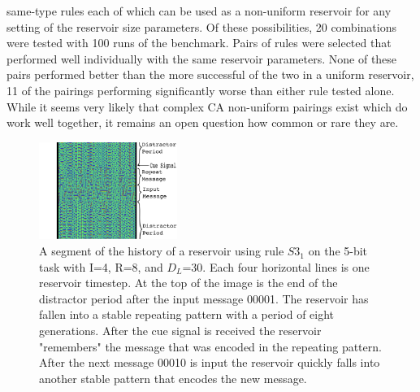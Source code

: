 \documentclass{elsarticle}
\begin{document}
\begin{multicols}{2}
            same-type rules each of which can be used as a non-uniform 
            reservoir for  any setting of the reservoir size parameters. Of 
            these possibilities, 20 combinations were tested with 100 runs of 
            the benchmark. Pairs of rules were selected that performed well 
            individually with the same reservoir parameters.  None of these 
            pairs performed better than the more successful of the two in a 
            uniform reservoir, 11 of the pairings performing significantly 
            worse than either rule tested alone. While it seems very likely 
            that complex CA non-uniform pairings exist which do work well 
            together, it remains an open question how common or rare they are.
 

\begin{figure}[H]
\centering
\includegraphics[width=0.4\textwidth]{RepeatMessage.png}
\caption{A segment of the history of a reservoir using rule $S3_{1}$ on the 
   5-bit task with I=4, R=8, and $D_{L}$=30. Each four horizontal lines is one 
      reservoir timestep. At the top of the image is the end of the distractor 
      period after the input message 00001. The reservoir has fallen into a 
      stable repeating pattern with a period of eight generations. After the 
      cue signal is received the reservoir "remembers" the message that was 
      encoded in the repeating pattern. After the next message 00010 is input 
      the reservoir quickly falls into another stable pattern that encodes the 
      new message.} 
        
\label{repeat}
\end{figure}

\iffalse


\end{multicols}
\end{document}
